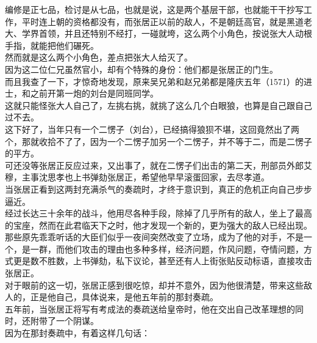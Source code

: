 \begin{multicols}{\theparacolNo}
编修是正七品，检讨是从七品，也就是说，这是两个基层干部，也就能干干抄写工作，平时连上朝的资格都没有，而张居正以前的敌人，不是朝廷高官，就是黑道老大、学界首领，并且还特别不经打，一碰就垮，这么两个小角色，按说张大人动根手指，就能把他们碾死。\\

然而就是这么两个小角色，差点把张大人给灭了。\\

因为这二位仁兄虽然官小，却有个特殊的身份：他们都是张居正的门生。\\

而且我查了一下，才惊奇地发现，原来吴兄弟和赵兄弟都是隆庆五年（1571）的进士，和之前开第一炮的刘台是同班同学。\\

这就只能怪张大人自己了，左挑右挑，就挑了这么几个白眼狼，也算是自己跟自己过不去。\\

这下好了，当年只有一个二愣子（刘台），已经搞得狼狈不堪，这回竟然出了两个，那就收拾不了了，因为一个二愣子加另一个二愣子，并不等于二，而是二愣子的平方。\\

可还没等张居正反应过来，又出事了，就在二愣子们出击的第二天，刑部员外郎艾穆，主事沈思孝也上书弹劾张居正，希望他早早滚蛋回家，去尽孝道。\\

当张居正看到这两封充满杀气的奏疏时，才终于意识到，真正的危机正向自己步步逼近。\\

经过长达三十余年的战斗，他用尽各种手段，除掉了几乎所有的敌人，坐上了最高的宝座，然而在此君临天下之时，他才发现一个新的，更为强大的敌人已经出现。\\

那些原先乖乖听话的大臣们似乎一夜间突然改变了立场，成为了他的对手，不是一个，是一群，而他们攻击的理由也多种多样，经济问题，作风问题，夺情问题，方式更是数不胜数，上书弹劾，私下议论，甚至还有人上街张贴反动标语，直接攻击张居正。\\

对于眼前的这一切，张居正感到很吃惊，却并不意外，因为他很清楚，带来这些敌人的，正是他自己，具体说来，是他五年前的那封奏疏。\\

五年前，当张居正将写有考成法的奏疏送给皇帝时，他在交出自己改革理想的同时，还附带了一个阴谋。\\

因为在那封奏疏中，有着这样几句话：\\


\end{multicols}
